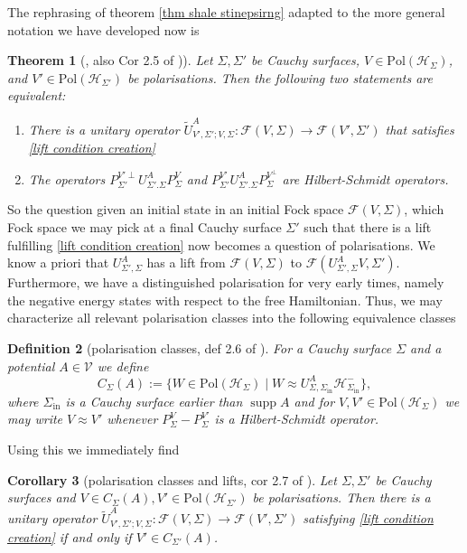 \documentclass[b5paper,draft,openbib,12pt]{memoir}
\newtheorem{Def}{Definition}
\newtheorem{Thm}[Def]{Theorem}
\newtheorem{Corollary}[Def]{Corollary}
\DeclareMathOperator*{\supp}{supp}
\begin{document}
The rephrasing of theorem \ref{thm shale stinepsirng} 
adapted to the more general notation we have developed now is
\begin{Thm}[\cite{ivp2}, also Cor 2.5 of \cite{deckert2016perspective})]
Let \(\Sigma, \Sigma'\) be Cauchy surfaces, 
\(V\in \text{Pol}(\mathcal{H}_\Sigma)\), and 
\(V'\in \text{Pol}(\mathcal{H}_{\Sigma'})\) be polarisations. 
Then the following two statements are equivalent:
\begin{enumerate}[label=\alph*)]
\item There is a unitary operator 
\(\tilde{U}^A_{V',\Sigma';V, \Sigma}:
\mathcal{F}(V,\Sigma)\rightarrow \mathcal{F}(V',\Sigma')\)
that satisfies \eqref{lift condition creation}
\item The operators 
\(P^{{V'}\perp}_{\Sigma'}U^A_{\Sigma'.\Sigma}P^{{V}}_{\Sigma}\) and
\(P^{{V'}}_{\Sigma'}U^A_{\Sigma'.\Sigma}P^{{V}^\perp}_{\Sigma}\) are 
Hilbert-Schmidt operators.
\end{enumerate}
\end{Thm}

So the question given an initial state in an initial Fock space 
\(\mathcal{F}(V,\Sigma)\),
which Fock space we may pick at a final Cauchy surface \(\Sigma'\)
such that there is a lift fulfilling \eqref{lift condition creation}
now becomes a question of polarisations. We know a priori 
that \(U^A_{\Sigma',\Sigma}\) has a lift from 
\(\mathcal{F}(V,\Sigma)\) to 
\(\mathcal{F}(U^A_{\Sigma',\Sigma}V,\Sigma')\). Furthermore, we have a 
distinguished polarisation for very early times, namely the negative 
energy states with respect to the free Hamiltonian. Thus, we may 
characterize all relevant polarisation classes into the following
equivalence classes 

\begin{Def}[polarisation classes, def 2.6 of \cite{deckert2016perspective}]\label{def pol class}
For a Cauchy surface \(\Sigma\) and a potential \(A\in\mathcal{V}\) 
we define 
\begin{equation}
C_{\Sigma}(A):=\big\{W\in\text{Pol}(\mathcal{H}_\Sigma)\mid 
W \approx U^A_{\Sigma,\Sigma_{\mathrm{in}}}\mathcal{H}^-_{\Sigma_{\mathrm{in}}}\big\},
\end{equation}
where \(\Sigma_{\mathrm{in}}\) is a Cauchy surface earlier than \(\supp A\)
and for \(V,V'\in\text{Pol}(\mathcal{H}_{\Sigma})\) we may write \(V\approx V'\)
whenever \(P^V_{\Sigma}-P^{V'}_{\Sigma}\) is a Hilbert-Schmidt operator. 
\end{Def}

Using this we immediately find 
\begin{Corollary}[polarisation classes and lifts, cor 2.7 of \cite{deckert2016perspective}]\label{cor: pol class lift}
Let \(\Sigma, \Sigma'\) be Cauchy surfaces and 
\(V\in C_\Sigma(A), V'\in \text{Pol}(\mathcal{H}_{\Sigma'})\) be 
polarisations. Then there is a unitary operator 
\(\tilde{U}^A_{V',\Sigma'; V,\Sigma}:\mathcal{F}(V,\Sigma)
\rightarrow \mathcal{F}(V',\Sigma')\) satisfying 
\eqref{lift condition creation} if and only if 
\(V'\in C_{\Sigma'}(A)\).
\end{Corollary}
\end{document}
